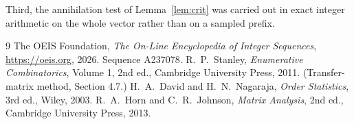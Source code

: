 \documentclass[11pt,a4paper]{article}
\theoremstyle{plain}
\theoremstyle{definition}
\begin{document}
Third, the annihilation test of Lemma~\ref{lem:crit} was carried out in exact integer
arithmetic on the whole vector rather than on a sampled prefix.

\begin{thebibliography}{9}
 The OEIS Foundation, \emph{The On-Line Encyclopedia of Integer
Sequences}, \url{https://oeis.org}, 2026. Sequence A237078.
 R.~P.~Stanley, \emph{Enumerative Combinatorics}, Volume 1, 2nd ed.,
Cambridge University Press, 2011. (Transfer-matrix method, Section 4.7.)
 H.~A.~David and H.~N.~Nagaraja, \emph{Order Statistics}, 3rd ed., Wiley,
2003.
 R.~A.~Horn and C.~R.~Johnson, \emph{Matrix Analysis}, 2nd ed., Cambridge
University Press, 2013.
\end{thebibliography}
\end{document}
